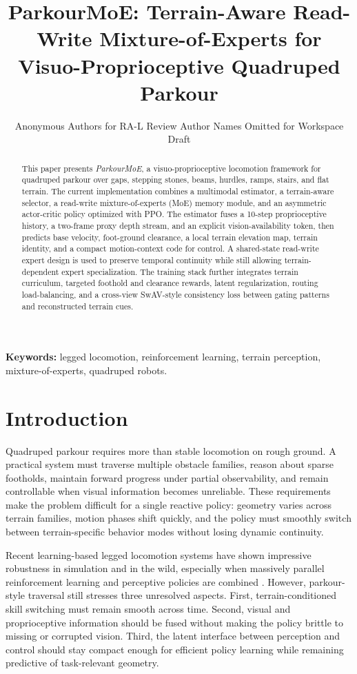 \documentclass[letterpaper,10pt,conference]{ieeeconf}
\title{\LARGE \bf
ParkourMoE: Terrain-Aware Read-Write Mixture-of-Experts for\\
Visuo-Proprioceptive Quadruped Parkour
}
\author{
\ifreview
Anonymous Authors for RA-L Review
\else
Author Names Omitted for Workspace Draft
\fi
}
\newif\ifshowtodo
\DeclareRobustCommand{\papercomment}[1]{%
    \ifshowtodo
    \textcolor{blue}{\textbf{[TODO]} #1}%
    \fi
}
\begin{document}
\maketitle
\thispagestyle{empty}
\pagestyle{empty}

\begin{abstract}
This paper presents \emph{ParkourMoE}, a visuo-proprioceptive locomotion framework for quadruped parkour over gaps, stepping stones, beams, hurdles, ramps, stairs, and flat terrain. The current implementation combines a multimodal estimator, a terrain-aware selector, a read-write mixture-of-experts (MoE) memory module, and an asymmetric actor-critic policy optimized with PPO. The estimator fuses a 10-step proprioceptive history, a two-frame proxy depth stream, and an explicit vision-availability token, then predicts base velocity, foot-ground clearance, a local terrain elevation map, terrain identity, and a compact motion-context code for control. A shared-state read-write expert design is used to preserve temporal continuity while still allowing terrain-dependent expert specialization. The training stack further integrates terrain curriculum, targeted foothold and clearance rewards, latent regularization, routing load-balancing, and a cross-view SwAV-style consistency loss between gating patterns and reconstructed terrain cues. \papercomment{Replace this sentence with final quantitative gains, e.g., success-rate and forward-progress improvements over the strongest baselines.}
\end{abstract}

\vspace{0.4em}
\noindent\textbf{Keywords:} legged locomotion, reinforcement learning, terrain perception, mixture-of-experts, quadruped robots.

\section{Introduction}
Quadruped parkour requires more than stable locomotion on rough ground. A practical system must traverse multiple obstacle families, reason about sparse footholds, maintain forward progress under partial observability, and remain controllable when visual information becomes unreliable. These requirements make the problem difficult for a single reactive policy: geometry varies across terrain families, motion phases shift quickly, and the policy must smoothly switch between terrain-specific behavior modes without losing dynamic continuity.

Recent learning-based legged locomotion systems have shown impressive robustness in simulation and in the wild, especially when massively parallel reinforcement learning and perceptive policies are combined \cite{rudin2022learning,miki2022learning,hwangbo2019learning}. However, parkour-style traversal still stresses three unresolved aspects. First, terrain-conditioned skill switching must remain smooth across time. Second, visual and proprioceptive information should be fused without making the policy brittle to missing or corrupted vision. Third, the latent interface between perception and control should stay compact enough for efficient policy learning while remaining predictive of task-relevant geometry.
\end{document}
